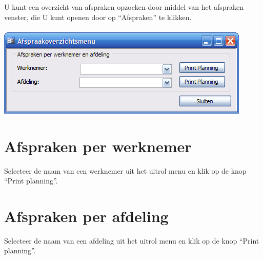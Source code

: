 U kunt een overzicht van afspraken opzoeken door middel van het afspraken venster, die U kunt openen door op  ``Afspraken'' te klikken.\\
\\
\includegraphics[scale=.7]{afspraken1}

\section{Afspraken per werknemer}\label{sec:per werknemer}

Selecteer de naam van een werknemer uit het uitrol menu en klik op de knop ``Print planning''.

\section{Afspraken per afdeling}\label{sec:per afdeling}

Selecteer de naam van een afdeling uit het uitrol menu en klik op de knop ``Print planning''.